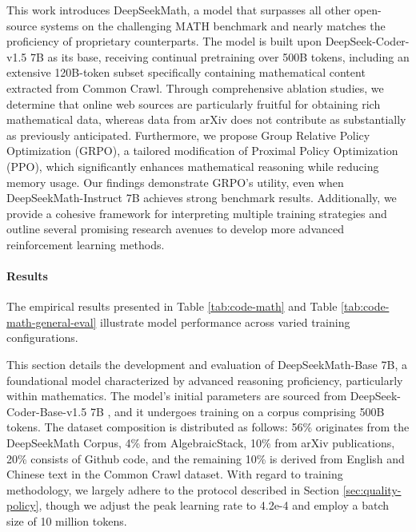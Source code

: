 This work introduces DeepSeekMath, a model that surpasses all other open-source systems on the challenging MATH benchmark and nearly matches the proficiency of proprietary counterparts. The model is built upon DeepSeek-Coder-v1.5 7B as its base, receiving continual pretraining over 500B tokens, including an extensive 120B-token subset specifically containing mathematical content extracted from Common Crawl. Through comprehensive ablation studies, we determine that online web sources are particularly fruitful for obtaining rich mathematical data, whereas data from arXiv does not contribute as substantially as previously anticipated. Furthermore, we propose Group Relative Policy Optimization (GRPO), a tailored modification of Proximal Policy Optimization (PPO), which significantly enhances mathematical reasoning while reducing memory usage. Our findings demonstrate GRPO’s utility, even when DeepSeekMath-Instruct 7B achieves strong benchmark results. Additionally, we provide a cohesive framework for interpreting multiple training strategies and outline several promising research avenues to develop more advanced reinforcement learning methods.

\paragraph{Results}
The empirical results presented in Table \ref{tab:code-math} and Table \ref{tab:code-math-general-eval} illustrate model performance across varied training configurations.

This section details the development and evaluation of DeepSeekMath-Base 7B, a foundational model characterized by advanced reasoning proficiency, particularly within mathematics. The model's initial parameters are sourced from DeepSeek-Coder-Base-v1.5 7B \citep{deepseek-coder}, and it undergoes training on a corpus comprising 500B tokens. The dataset composition is distributed as follows: 56\% originates from the DeepSeekMath Corpus, 4\% from AlgebraicStack, 10\% from arXiv publications, 20\% consists of Github code, and the remaining 10\% is derived from English and Chinese text in the Common Crawl dataset. With regard to training methodology, we largely adhere to the protocol described in Section \ref{sec:quality-policy}, though we adjust the peak learning rate to 4.2e-4 and employ a batch size of 10 million tokens.

